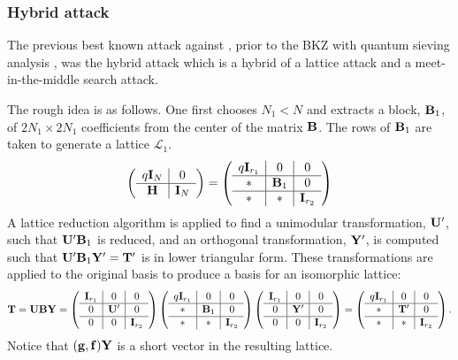 \documentclass{llncs}
\newcommand{\Lcal}{{\mathcal L}}
\newcommand{\bff}{{\bf f}}
\newcommand{\bfg}{{\bf g}}
\newcommand{\bfB}{{\bf B}}
\newcommand{\bfH}{{\bf H}}
\newcommand{\bfI}{{\bf I}}
\newcommand{\bfT}{{\bf T}}
\newcommand{\bfU}{{\bf U}}
\newcommand{\bfY}{{\bf Y}}
\newcommand{\ntru}{{\sf{NTRU}}}
\newcommand{\<}{\langle}
\renewcommand{\>}{\rangle}
\begin{document}
\subsubsection{Hybrid attack}
The previous best known attack against \ntru, prior to the 
BKZ with quantum sieving analysis \cite{newhope}, was the
hybrid attack \cite{Nick07} which is a hybrid of a lattice attack and a meet-in-the-middle
search attack. %



The rough idea is as follows.  One first chooses $N_1 < N$ and extracts a block, $\bfB_1$,
of $2N_1\times2N_1$ coefficients from the center of the matrix $\bfB$. The rows of $\bfB_1$ are taken to generate a lattice $\Lcal_1$.
\begin{eqnarray}
\left(
\begin{array}{c|c}
q\bfI_{N} & 0  \\ \hline
\bfH &  \bfI_{N}
\end{array}
\right)
=
\left(
\begin{array}{c|c|c}
q\bfI_{r_1} & 0 & 0 \\ \hline
* & \bfB_1 & 0 \\ \hline
* & * & \bfI_{r_2}
\end{array}
\right)
\end{eqnarray}
A lattice reduction algorithm is applied to find a unimodular transformation, $\bfU'$, such that $\bfU'\bfB_1$ is
reduced, and an orthogonal transformation, $\bfY'$, is computed such that $\bfU'\bfB_1\bfY' =\bfT'$ is in lower triangular form.
These transformations are applied to the original basis to produce a basis for an isomorphic lattice:
\begin{eqnarray}
\label{eq:T}
\bfT = \bfU\bfB\bfY =
\left(
\begin{array}{c|c|c}
\bfI_{r_1} & 0 & 0 \\ \hline
0 & \bfU' & 0 \\ \hline
0 & 0 & \bfI_{r_2}
\end{array}
\right)
\left(
\begin{array}{c|c|c}
q\bfI_{r_1} & 0 & 0 \\ \hline
* & \bfB_1 & 0 \\ \hline
* & * & \bfI_{r_2}
\end{array}
\right)
\left(
\begin{array}{c|c|c}
\bfI_{r_1} & 0 & 0 \\ \hline
0 & \bfY' & 0 \\ \hline
0 & 0 & \bfI_{r_2}
\end{array}
\right)
=
\left(
\begin{array}{c|c|c}
q\bfI_{r_1} & 0 & 0 \\ \hline
* & \bfT' & 0 \\ \hline
* & * & \bfI_{r_2}
\end{array}
\right).
\end{eqnarray}
Notice that $(\bfg, \bff)\bfY$ is a short vector in the resulting lattice.
\end{document}
